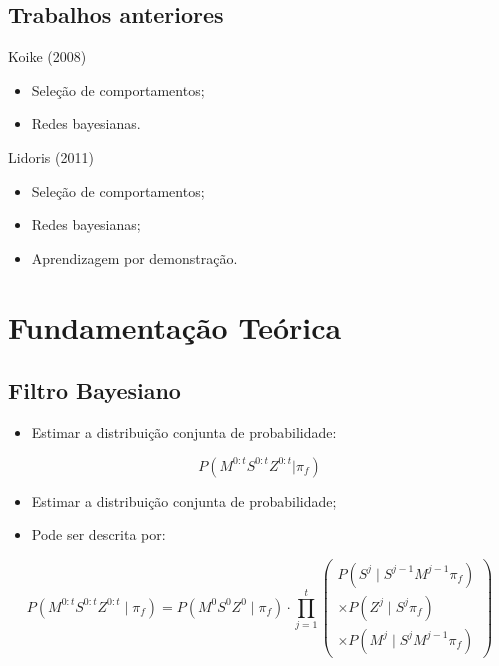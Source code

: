 \documentclass{beamer}
\begin{document}

\subsection{Trabalhos anteriores}

\begin{frame}
Koike (2008) \cite{Koike:2008}
\begin{itemize}
	\item Seleção de comportamentos;
	\item Redes bayesianas.
\end{itemize}\pause

Lidoris (2011) \cite{lidoris2011state}
\begin{itemize}
	\item Seleção de comportamentos;
	\item Redes bayesianas;
	\item Aprendizagem por demonstração.
\end{itemize}
\end{frame}

\section{Fundamentação Teórica}

\subsection{Filtro Bayesiano}

\begin{frame}
\begin{overprint}
\begin{itemize}
	\item Estimar a distribuição conjunta de probabilidade:
\end{itemize}

$$ P \left( M^{0:t} S^{0:t} Z^{0:t} | \pi_f \right) $$
\begin{itemize}
	\item Estimar a distribuição conjunta de probabilidade;
	\item Pode ser descrita por:
\end{itemize}

$$
	P ( M^{0: t} S^{0: t} Z^{0: t} \mid \pi_f ) = P ( M^0 S^0 Z^0 \mid \pi_f ) \cdot \prod\limits_{j =1}^{t} 
        \left(
            \begin{array}{l}
                P( S^j \mid S^{j -1} M^{j -1} \pi_f ) \\
                \times P( Z^j \mid S^j \pi_f ) \\
                \times P( M^j \mid S^j M^{j -1} \pi_f )
            \end{array}
        \right)
$$
\end{overprint}

\end{frame}
\end{document}
